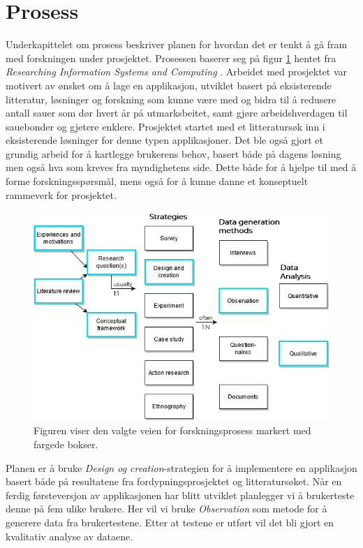 \section{Prosess}
Underkapittelet om prosess beskriver planen for hvordan det er tenkt å gå fram med forskningen under prosjektet. Prosessen baserer seg på figur \ref{fig:research_process} hentet fra \textit{Researching Information Systems and Computing} \cite{oatesResearchingInformationSystems2013}.
\newline
\newline
\noindent
Arbeidet med prosjektet var motivert av ønsket om å lage en applikasjon, utviklet basert på eksisterende litteratur, løsninger og forskning som kunne være med og bidra til å redusere antall sauer som dør hvert år på utmarksbeitet, samt gjøre arbeidshverdagen til sauebonder og gjetere enklere. Prosjektet startet med et litteratursøk inn i eksisterende løsninger for denne typen applikasjoner. Det ble også gjort et grundig arbeid for å kartlegge brukerens behov, basert både på dagens løsning men også hva som kreves fra myndighetens side. Dette både for å hjelpe til med å forme forskningsspørsmål, mens også for å kunne danne et konseptuelt rammeverk for prosjektet. 
\begin{figure}[H]
\centering
\captionsetup{width=.8\linewidth}
\includegraphics[scale=0.6]{Figurer/diagram/research_process.png}
\caption{Figuren viser den valgte veien for forskningsprosess markert med fargede bokser.}
\label{fig:research_process}
\end{figure}

\noindent
Planen er å bruke \textit{Design og creation}-strategien for å implementere en applikasjon basert både på resultatene fra fordypningsprosjektet og litteratursøket. Når en ferdig førsteversjon av applikasjonen har blitt utviklet planlegger vi å brukerteste denne på fem ulike brukere. Her vil vi bruke \textit{Observation} som metode for å generere data fra brukertestene. Etter at testene er utført vil det bli gjort en kvalitativ analyse av dataene.

